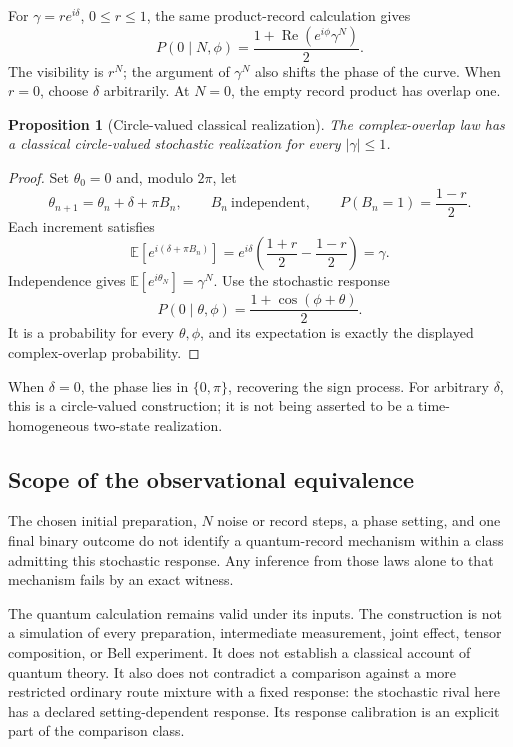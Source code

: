 \documentclass[11pt,letterpaper]{article}
\newtheorem{proposition}[theorem]{Proposition}
\begin{document}
For \(\gamma=r e^{i\delta}\), \(0\le r\le1\), the same product-record
calculation gives
\begin{equation}
 P(0\mid N,\phi)=\frac{1+\operatorname{Re}(e^{i\phi}\gamma^N)}2.
 \label{eq:complex-visibility}
\end{equation}
The visibility is \(r^N\); the argument of \(\gamma^N\) also shifts the
phase of the curve. When \(r=0\), choose \(\delta\) arbitrarily.
At \(N=0\), the empty record product has overlap one.

\begin{proposition}[Circle-valued classical realization]
The complex-overlap law has a classical circle-valued stochastic
realization for every \(|\gamma|\le1\).
\end{proposition}
\begin{proof}
Set \(\theta_0=0\) and, modulo \(2\pi\), let
\[
 \theta_{n+1}=\theta_n+\delta+\pi B_n,\qquad
 B_n\ \text{independent},\qquad P(B_n=1)=\frac{1-r}{2}.
\]
Each increment satisfies
\[
 \mathbb E[e^{i(\delta+\pi B_n)}]
 =e^{i\delta}\left(\frac{1+r}{2}-\frac{1-r}{2}\right)=\gamma.
\]
Independence gives \(\mathbb E[e^{i\theta_N}]=\gamma^N\).
Use the stochastic response
\[
 P(0\mid\theta,\phi)=\frac{1+\cos(\phi+\theta)}2.
\]
It is a probability for every \(\theta,\phi\), and its expectation is exactly
the displayed complex-overlap probability.
\end{proof}

When \(\delta=0\), the phase lies in \(\{0,\pi\}\), recovering the sign process.
For arbitrary \(\delta\), this is a circle-valued construction; it is not
being asserted to be a time-homogeneous two-state realization.

\subsection{Scope of the observational equivalence} The chosen initial preparation, $N$ noise or record steps, a phase setting, and one final binary outcome do not identify a quantum-record mechanism within a class admitting this stochastic response. Any inference from those laws alone to that mechanism fails by an exact witness.

The quantum calculation remains valid under its inputs. The construction is not a simulation of every preparation, intermediate measurement, joint effect, tensor composition, or Bell experiment. It does not establish a classical account of quantum theory. It also does not contradict a comparison against a more restricted ordinary route mixture with a fixed response: the stochastic rival here has a declared setting-dependent response. Its response calibration is an explicit part of the comparison class.
\end{document}
